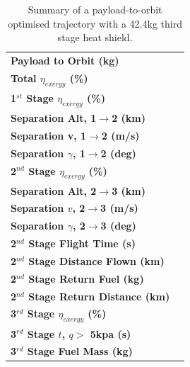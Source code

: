 \begin{table}[!ht]
	\centering
	
	\begin{tabular}{l c } 
		\hline \textbf{Payload to Orbit (kg)}
		& \textbf{\PayloadToOrbitTPSreduced}
		\\
		\textbf{Total $\eta_{exergy}$ (\%)}
		& \textbf{\totalExergyEffTPSreduced}
		\\
		\hline 
		\textbf{1$^{st}$ Stage $\eta_{exergy}$ (\%)}
		& \textbf{\firstExergyEffTPSreduced}
		\\
		\textbf{Separation Alt, 1$\rightarrow$2 (km)}
		& \firstsecondSeparationAltTPSreduced
		\\
		\textbf{Separation v, 1$\rightarrow$2 (m/s)}
		& \firstsecondSeparationvTPSreduced
		\\
		\textbf{Separation $\gamma$, 1$\rightarrow$2 (deg)}
		& \firstsecondSeparationgammaTPSreduced
		\\
		\hline 
		\textbf{2$^{nd}$ Stage $\eta_{exergy}$ (\%)}
		& \textbf{\secondExergyEffTPSreduced}
		\\
		\textbf{Separation Alt, 2$\rightarrow$3 (km)}
		& \secondthirdSeparationAltTPSreduced
		\\
		\textbf{Separation $v$, 2$\rightarrow$3 (m/s)}
		& \secondthirdSeparationvTPSreduced
		\\
		\textbf{Separation $\gamma$, 2$\rightarrow$3 (deg)}
		& \secondthirdSeparationgammaTPSreduced
		\\
		\textbf{2$^{nd}$ Stage Flight Time (s)}
		& \secondFlightTimeTPSreduced
		\\
		\textbf{2$^{nd}$ Stage Distance Flown (km)}
		& \SecondDistTPSreduced
		\\
		\textbf{2$^{nd}$ Stage Return Fuel (kg)}
		& \returnFuelTPSreduced
		\\
		\textbf{2$^{nd}$ Stage Return Distance (km)}
		& \returnDistTPSreduced
		\\
		\hline 
		\textbf{3$^{rd}$ Stage $\eta_{exergy}$ (\%)}
		& \textbf{\thirddExergyEffTPSreduced}
		\\
		\textbf{3$^{rd}$ Stage $t$, $q >$ 5kpa (s)}
		& \thirdqOverFiveTPSreduced
		\\
		\textbf{3$^{rd}$ Stage Fuel Mass (kg)}
		& \thirdmFuelTPSreduced
		\\
		\hline 
	\end{tabular} 
	\caption{Summary of a payload-to-orbit optimised trajectory with a 42.4kg third stage heat shield.}
	\label{tab:heatshieldreduced}
	
\end{table}

